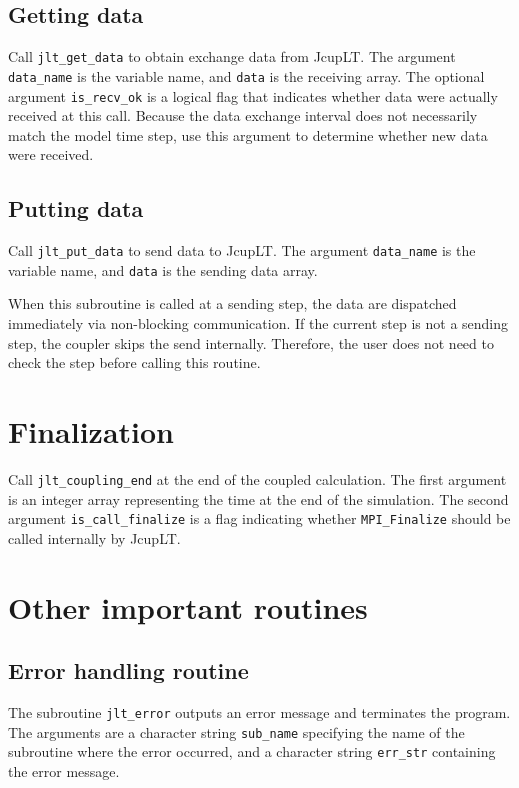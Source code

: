 \documentclass[11pt,a4paper]{report}
\begin{document}
\subsection{Getting data}

Call \texttt{jlt\_get\_data} to obtain exchange data
from JcupLT.
The argument \texttt{data\_name} is the variable name,
and \texttt{data} is the receiving array.
The optional argument \texttt{is\_recv\_ok}
is a logical flag that indicates
whether data were actually received at this call.
Because the data exchange interval
does not necessarily match the model time step,
use this argument to determine
whether new data were received.

\subsection{Putting data}

Call \texttt{jlt\_put\_data} to send data to JcupLT.
The argument \texttt{data\_name} is the variable name,
and \texttt{data} is the sending data array.

When this subroutine is called at a sending step,
the data are dispatched immediately
via non-blocking communication.
If the current step is not a sending step,
the coupler skips the send internally.
Therefore, the user does not need to check
the step before calling this routine.

\section{Finalization}

Call \texttt{jlt\_coupling\_end} at the end of the coupled calculation.
The first argument is an integer array
representing the time at the end of the simulation.
The second argument \texttt{is\_call\_finalize} is a flag
indicating whether \texttt{MPI\_Finalize}
should be called internally by JcupLT.


\section{Other important routines}

\subsection{Error handling routine}

The subroutine \texttt{jlt\_error}
outputs an error message and terminates the program.
The arguments are
a character string \texttt{sub\_name}
specifying the name of the subroutine where the error occurred,
and a character string \texttt{err\_str}
containing the error message.
\end{document}
